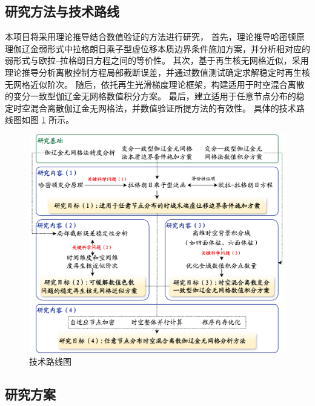 \setlength{\abovedisplayskip}{0pt}
\setlength{\belowdisplayskip}{0pt}

\subsection{研究方法与技术路线}

本项目将采用理论推导结合数值验证的方法进行研究，
首先，理论推导哈密顿原理伽辽金弱形式中拉格朗日乘子型虚位移本质边界条件施加方案，并分析相对应的弱形式与欧拉--拉格朗日方程之间的等价性。
其次，基于再生核无网格近似，采用理论推导分析离散控制方程局部截断误差，并通过数值测试确定求解稳定时再生核无网格近似阶次。
随后，依托再生光滑梯度理论框架，构建适用于时空混合离散的变分一致型伽辽金无网格数值积分方案。
最后，建立适用于任意节点分布的稳定时空混合离散伽辽金无网格法，并数值验证所提方法的有效性。
具体的技术路线图如图 \ref{fg:roadmap} 所示。

\vspace{24pt}
\begin{figure}[!h]
    \centering 
    \includegraphics[width=\textwidth]{figures/roadmap.png}
    \caption{技术路线图}
    \label{fg:roadmap}
\end{figure}
 
\newpage

\subsection{研究方案}

